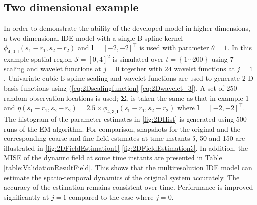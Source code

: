 \documentclass[journal,a4paper]{IEEEtran}
\begin{document}
{\subsection{Two dimensional example}
In order to demonstrate the ability of the developed model in higher dimensions, a two dimensional IDE model with a single B-spline kernel $\phi_{4;0,\mathbf{l}}\left(s_1-r_1,s_2-r_2\right) $ and $\mathbf l=[-2,-2]^ \top$ is used with parameter $\theta=1$. In this example spatial region $\mathcal{S}=[0,4]^2 $ is simulated over $t=\left\lbrace1 \cdots 200  \right\rbrace $ using $7$ scaling and wavelet functions at $j=0$ together with $24$ wavelet functions at $j=1$. Univariate cubic B-spline scaling and wavelet functions are used to generate 2-D basis functions using (\ref{eq:2Dscalingfunction}-\ref{eq:2Dwavelet_3}). A set of $250$ random  observation locations is used; $\mathbf{\Sigma}_v$ is taken the same as that in example 1 and $ \eta\left(s_1-r_1,s_2-r_2\right) =2.5\times\phi_{4,3,\mathbf{l}}\left(s_1-r_1,s_2-r_2\right)$ where $\mathbf l=[-2,-2]^ \top$. The histogram of the parameter estimates  in \figurename{\ref{fig:2DHist} is generated using 500 runs of the EM algorithm. For comparison, snapshots for the original and the corresponding coarse and fine field estimates at time instants 5, 50 and 150 are illustrated in \figurename{\ref{fig:2DFieldEstimation1}-\ref{fig:2DFieldEstimation3}}. In addition, the MISE of the dynamic field at some time instants are presented in Table \ref{table:ValidationResultField}.  This shows that the multiresolution IDE model can estimate the spatio-temporal dynamics of the original system accurately. The accuracy of the estimation remains consistent over time. Performance is improved significantly at $j=1$ compared to the case where $j=0$.
}}
\end{document}
